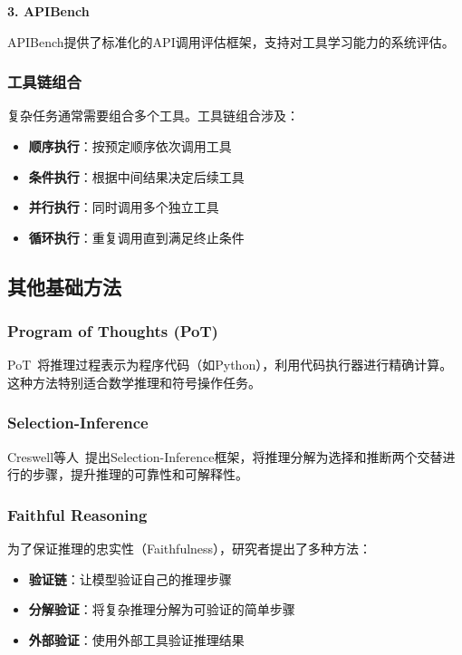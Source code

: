 \textbf{3. APIBench}

APIBench提供了标准化的API调用评估框架，支持对工具学习能力的系统评估。

\subsubsection{工具链组合}

复杂任务通常需要组合多个工具。工具链组合涉及：

\begin{itemize}[leftmargin=2em]
    \item \textbf{顺序执行}：按预定顺序依次调用工具
    \item \textbf{条件执行}：根据中间结果决定后续工具
    \item \textbf{并行执行}：同时调用多个独立工具
    \item \textbf{循环执行}：重复调用直到满足终止条件
\end{itemize}

\subsection{其他基础方法}

\subsubsection{Program of Thoughts (PoT)}

PoT~\cite{chen2022program}将推理过程表示为程序代码（如Python），利用代码执行器进行精确计算。这种方法特别适合数学推理和符号操作任务。

\subsubsection{Selection-Inference}

Creswell等人~\cite{creswell2022selection}提出Selection-Inference框架，将推理分解为选择和推断两个交替进行的步骤，提升推理的可靠性和可解释性。

\subsubsection{Faithful Reasoning}

为了保证推理的忠实性（Faithfulness），研究者提出了多种方法：

\begin{itemize}[leftmargin=2em]
    \item \textbf{验证链}：让模型验证自己的推理步骤
    \item \textbf{分解验证}：将复杂推理分解为可验证的简单步骤
    \item \textbf{外部验证}：使用外部工具验证推理结果
\end{itemize}

